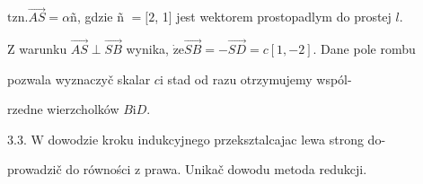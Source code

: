 \documentclass[a4paper,12pt]{article}
\begin{document}
$\mathrm{t}\mathrm{z}\mathrm{n}. \vec{AS}= \alpha$ñ, gdzie ñ $= [2$, 1$]$ jest wektorem prostopadlym do prostej $l.$

$\mathrm{Z}$ warunku $\vec{AS}\perp\vec{SB}$ wynika, $\dot{\mathrm{z}}\mathrm{e}\vec{SB}= - \vec{SD}=c[1,-2]$. Dane pole rombu

pozwala wyznaczyč skalar $c \mathrm{i}$ stad od razu otrzymujemy wspól-

rzedne wierzcholków $B\mathrm{i}D.$

3.3. $\mathrm{W}$ dowodzie kroku indukcyjnego przeksztalcajac lewa strong do-

prowadzič do równości $\mathrm{z}$ prawa. Unikač dowodu metoda redukcji.
\end{document}
